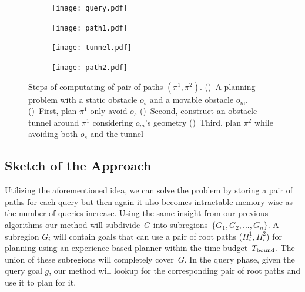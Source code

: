 \documentclass[a4paper]{report}
\begin{document}
\begin{figure}[t]
    \centering
    \begin{subfigure}{.45\textwidth}
        \texttt{[image: query.pdf]}
        \caption{}
        \label{fig:tun1}
    \end{subfigure}
    \hspace{4mm}
    \begin{subfigure}{0.45\textwidth}
        \texttt{[image: path1.pdf]}
        \caption{}
        \label{fig:tun2}
    \end{subfigure}
    \hspace{4mm}
    \begin{subfigure}{0.45\textwidth}
        \texttt{[image: tunnel.pdf]}
        \caption{}
        \label{fig:tun3}
    \end{subfigure}
    \begin{subfigure}{0.45\textwidth}
        \texttt{[image: path2.pdf]}
        \caption{}
        \label{fig:tun4}
    \end{subfigure}
    \caption{\CaptionTextSize
    Steps of computating of pair of paths $(\pi^1,\pi^2)$.
    ()~A planning problem with a static obstacle $o_s$ and a movable obstacle $o_m$.
    ()~First, plan $\pi^1$ only avoid $o_s$
    ()~Second, construct an obstacle tunnel around $\pi^1$ considering $o_m$'s geometry
        ()~Third, plan $\pi^2$ while avoiding both $o_s$ and the tunnel
    }
    \label{fig:movable}
    \vspace{-5mm}
\end{figure}

\subsection{Sketch of the Approach}
Utilizing the aforementioned idea, we can solve the problem by storing a pair of paths for each query but then again it also becomes intractable memory-wise as the number of queries increase. Using the same insight from our previous algorithms our method will subdivide~$G$ into subregions~$\{G_1,G_2,...,G_n\}$. A subregion $G_i$ will contain goals that can use a pair of root paths ($\Pi_i^1,\Pi_i^2$) for planning using an experience-based planner within the time budget~$T_{\textrm{bound}}$. The union of these subregions will completely cover~$G$. In the query phase, given the query goal $g$, our method will lookup for the corresponding pair of root paths and use it to plan for it.
\end{document}
